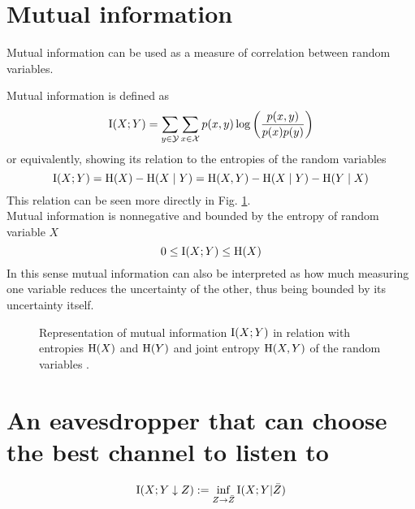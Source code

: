 \label{ch:four}
\section{Mutual information}
    Mutual information can be used as a measure of correlation between random variables. 
	
	Mutual information is defined as
	\begin{equation}
		\operatorname{I}(X;Y) = \sum_{y\in\mathcal{Y}}\sum_{x\in\mathcal{X}} p(x,y) \log\left(\frac{p(x,y)}{p(x)p(y)}\right) 
	\end{equation}
	or equivalently, showing its relation to the entropies of the random variables
	\begin{equation}
		\operatorname{I}(X;Y) = \operatorname{H}(X) - \operatorname{H}(X\mid Y) = \operatorname{H}(X,Y) - \operatorname{H}(X\mid Y) - \operatorname{H}(Y\mid X)
	\end{equation}
	This relation can be seen more directly in Fig. \ref{fig:mutual_info}.\\
	Mutual information is nonnegative and bounded by the entropy of random variable $X$
	\begin{equation}
		0 \leq \operatorname{I}(X;Y) \leq \operatorname{H}(X)
	\end{equation}
	In this sense mutual information can also be interpreted as how much measuring one variable reduces the uncertainty of the other, thus being bounded by its uncertainty itself.
	
	\begin{figure}[h]
		\centering
		
		\caption{Representation of mutual information $\operatorname{I}(X;Y)$ in relation with entropies $\operatorname{H}(X)$ and $\operatorname{H}(Y)$ and joint entropy $\operatorname{H}(X,Y)$ of the random variables .
		\label{fig:mutual_info}}
	\end{figure}	
\section{An eavesdropper that can choose the best channel to listen to}
   
    \begin{equation} \label{intrininfo}
    	\operatorname{I}(X;Y\downarrow Z):= \inf_{Z\rightarrow \bar{Z}} \operatorname{I}(X;Y | \bar{Z})
    \end{equation}
